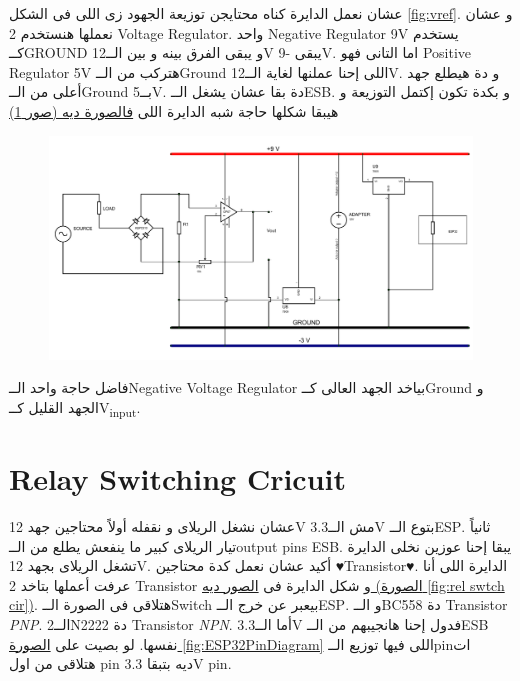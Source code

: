 \documentclass{article}
\begin{document}
عشان نعمل الدايرة كناه محتايجن توزيعة الجهود زى اللى فى الشكل \ref{fig:vref}. و عشان نعملها هنستخدم 2 \textenglish{Voltage Regulator}. 
واحد \textenglish{Negative Regulator 9V} يستخدم كــ\textenglish{GROUND} و يبقى الفرق بينه و بين الــ\textenglish{12V} يبقى \textenglish{-9V}.
اما التانى فهو \textenglish{Positive Regulator 5V} هتركب من الــ\textenglish{Ground} اللى إحنا عملنها لغاية الــ\textenglish{12V}. 
و دة هيطلع جهد أعلى من الــ\textenglish{Ground} بــ\textenglish{5V}. دة بقا عشان يشغل الــ\textenglish{ESB}. و بكدة تكون إكتمل التوزيعة و هيبقا شكلها حاجة شبه الدايرة اللى \hyperref[fig:project scheme]{فالصورة ديه (صور \ref*{fig:project scheme})}

\begin{figure}[h]
    \centering
    \includegraphics[width=\textwidth]{project scheme.pdf}
    \caption{}
    \label{fig:project scheme}
\end{figure}

فاضل حاجة واحد الــ\textenglish{Negative Voltage Regulator} بياخد الجهد العالى كــ\textenglish{Ground} و الجهد القليل كــ\textenglish{V\textsubscript{input}}.\\


\section{\textenglish{Relay Switching Cricuit}}

عشان نشغل الريلاى و نقفله أولاً محتاجين جهد \textenglish{12V} مش الــ\textenglish{3.3V} بتوع الــ\textenglish{ESP}.
ثانياً تيار الريلاى كبير ما ينفعش يطلع من الــ\textenglish{output pins ESB}.
يبقا إحنا عوزين نخلى الدايرة تشغل الريلاى بجهد \textenglish{12V}. أكيد عشان نعمل كدة محتاجين \textenglish{{♥}Transistor♥}.
الدايرة اللى أنا عرفت أعملها بتاخد 2 \textenglish{Transistor} و شكل الدايرة فى \hyperref[fig:rel swtch cir]{الصور ديه (الصورة \ref*{fig:rel swtch cir})}.
هتلاقى فى الصورة الــ\textenglish{Switch} بيعبر عن خرج الــ\textenglish{ESP}. و الــ\textenglish{BC558} دة \textenglish{Transistor \textit{PNP}}. 
الــ\textenglish{2N2222} دة \textenglish{Transistor \textit{NPN}}. أما الــ\textenglish{3.3V} فدول إحنا هانجيبهم من الــ\textenglish{ESB} نفسها.
لو بصيت على \hyperref[fig:ESP32PinDiagram]{الصورة \ref*{fig:ESP32PinDiagram}} اللى فيها توزيع الــ\textenglish{pin}ات هتلاقى من اول \textenglish{pin} ديه بتبقا \textenglish{3.3V pin}.
\\
\end{document}
